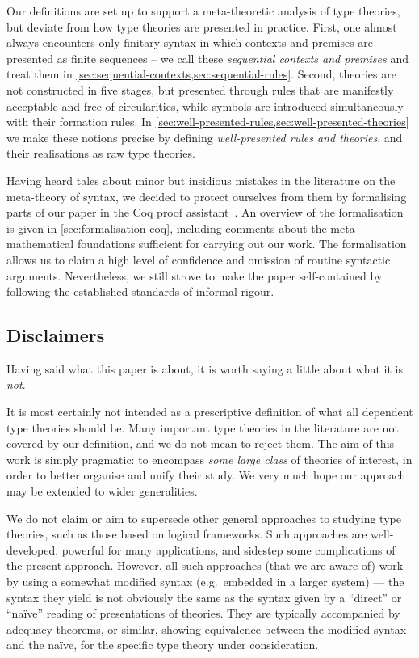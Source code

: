 Our definitions are set up to support a meta-theoretic analysis of type theories, but deviate from how type theories are presented in practice.
%
First, one almost always encounters only finitary syntax in which contexts and premises are presented as finite sequences -- we call these \emph{sequential contexts and premises} and treat them in \cref{sec:sequential-contexts,sec:sequential-rules}.
%
Second, theories are not constructed in five stages, but presented through rules that are manifestly acceptable and free of circularities, while symbols are introduced simultaneously with their formation rules. In \cref{sec:well-presented-rules,sec:well-presented-theories} we make these notions precise by defining \emph{well-presented rules and theories}, and their realisations as raw type theories.

Having heard tales about minor but insidious mistakes in the literature on the meta-theory of syntax, we decided to protect ourselves from them by formalising parts of our paper in the Coq proof assistant~\citep{coq}. An overview of the formalisation is given in \cref{sec:formalisation-coq}, including comments about the meta-mathematical foundations sufficient for carrying out our work.
%
The formalisation allows us to claim a high level of confidence and omission of routine syntactic arguments. Nevertheless, we still strove to make the paper self-contained by following the established standards of informal rigour.

\subsection{Disclaimers}

Having said what this paper is about, it is worth saying a little about what it is \emph{not}.

It is most certainly not intended as a prescriptive definition of what all dependent type theories should be.
%
Many important type theories in the literature are not covered by our definition, and we do not mean to reject them.
%
The aim of this work is simply pragmatic: to encompass \emph{some large class} of theories of interest, in order to better organise and unify their study.
%
We very much hope our approach may be extended to wider generalities.

We do not claim or aim to supersede other general approaches to studying type theories, such as those based on logical frameworks.
%
Such approaches are well-developed, powerful for many applications, and sidestep some complications of the present approach.
%
However, all such approaches (that we are aware of) work by using a somewhat modified syntax (e.g.~embedded in a larger system) --- the syntax they yield is not obviously the same as the syntax given by a “direct” or “naïve” reading of presentations of theories.
%
They are typically accompanied by adequacy theorems, or similar, showing equivalence between the modified syntax and the naïve, for the specific type theory under consideration.

